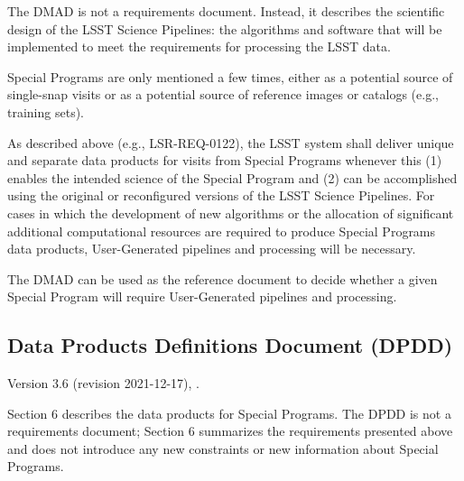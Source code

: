 The DMAD is not a requirements document.
Instead, it describes the scientific design of the LSST Science Pipelines: the algorithms and software that will 
be implemented to meet the requirements for processing the LSST data. 

Special Programs are only mentioned a few times, either as a potential source of single-snap visits or as a 
potential source of reference images or catalogs (e.g., training sets).

As described above (e.g., LSR-REQ-0122), the LSST system shall deliver unique and separate data products for visits 
from Special Programs whenever this (1) enables the intended science of the Special Program and (2) can be 
accomplished using the original or reconfigured versions of the LSST Science Pipelines.
For cases in which the development of new algorithms or the allocation of significant additional computational 
resources are required to produce Special Programs data products, User-Generated pipelines and processing will be 
necessary.

The DMAD can be used as the reference document to decide whether a given Special Program will require User-Generated pipelines and processing.


\subsection{Data Products Definitions Document (DPDD)}

Version 3.6 (revision 2021-12-17), .

Section 6 describes the data products for Special Programs.
The DPDD is not a requirements document; Section 6 summarizes the requirements presented above and does not introduce 
any new constraints or new information about Special Programs. 
